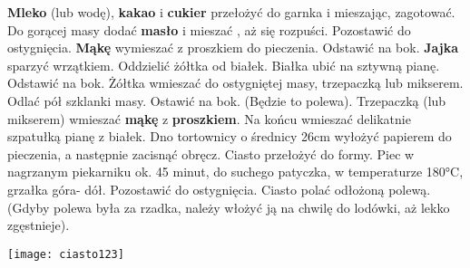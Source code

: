 \documentclass[12pt, letterpaper, titlepage]{article}
\begin{document}
\textbf{Mleko} (lub wodę), \textbf{kakao} i \textbf{cukier} przełożyć do garnka i mieszając, zagotować. Do gorącej masy dodać \textbf{masło} i mieszać , aż się rozpuści. Pozostawić do ostygnięcia.
\textbf{Mąkę} wymieszać z proszkiem do pieczenia. Odstawić na bok.
\textbf{Jajka} sparzyć wrzątkiem.  Oddzielić żółtka od białek. Białka ubić na sztywną pianę. Odstawić na bok. Żółtka wmieszać do ostygniętej masy, trzepaczką lub mikserem. Odlać pół szklanki masy. Ostawić na bok. (Będzie to polewa). Trzepaczką (lub mikserem) wmieszać \textbf{mąkę} z \textbf{proszkiem}. Na końcu wmieszać delikatnie szpatułką pianę z białek.
Dno tortownicy o średnicy 26cm wyłożyć papierem do pieczenia, a następnie zacisnąć obręcz. Ciasto przełożyć do formy.
Piec w nagrzanym piekarniku ok. 45 minut, do suchego patyczka, w temperaturze 180°C, grzałka góra- dół. Pozostawić do ostygnięcia.
Ciasto polać odłożoną polewą. (Gdyby polewa była za rzadka, należy włożyć ją na chwilę do lodówki, aż lekko zgęstnieje).

\begin{center}
\texttt{[image: ciasto123]}
\end{center}
\end{document}
